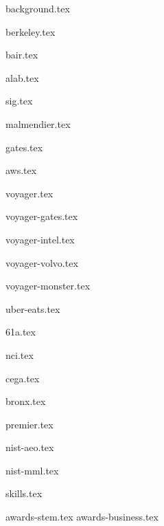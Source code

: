 \documentclass[11pt]{article}
\begin{document}
{background.tex}


{berkeley.tex}


{bair.tex}

{alab.tex}

{sig.tex}

{malmendier.tex}

{gates.tex}

{aws.tex}

{voyager.tex}

{voyager-gates.tex}

{voyager-intel.tex}

{voyager-volvo.tex}

{voyager-monster.tex}

{uber-eats.tex}

\newpage
{61a.tex}

{nci.tex}

{cega.tex}

{bronx.tex}

{premier.tex}

{nist-aeo.tex}

{nist-mml.tex}


{skills.tex}


{awards-stem.tex}
{awards-business.tex}
\end{document}
